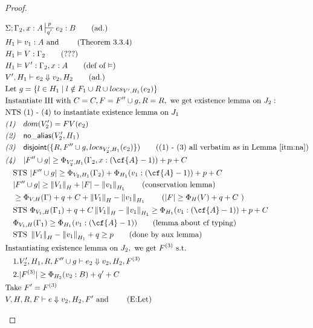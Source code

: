 \documentclass[11pt]{article}
\newcommand{\na}[1]{\mathsf{no\_alias}(#1)}
\newcommand{\dist}[1]{\mathsf{disjoint}(#1)}
\newcommand{\ssize}[2]{\left\Vert #2 \right\Vert_{#1}}
\theoremstyle{definition}
\begin{document}
\begin{proof}
\begin{description}
\begin{align*}
  &\Sigma; \Gamma_2, x : A \sststile{q'}{p} e_2 : B \tag{ad.}\\
  &H_1 \vDash v_1 : A \text{ and } \tag{Theorem 3.3.4}\\ 
  &H_1 \vDash V : \Gamma_2 \tag{???}\\
  &H_1 \vDash V' : \Gamma_2, x : A \tag{def of $\vDash$}\\
  &V',H_1 \vdash e_2 \Downarrow v_2,H_2 \tag{ad.}\\
  &\text{Let } g = \{l \in H_1 \mid l \notin F_1 \cup R \cup locs_{V',H_1}(e_2)\}\\ 
  &\text{Instantiate IH with } C = C, F = F'' \cup g, R = R, \text{ we get existence lemma on  } J_2:\\
  &\text{NTS (1) - (4) to instantiate existence lemma on } J_1\\
  &\emph{(1)} \quad dom(V_2') = FV(e_2)\\
  &\emph{(2)} \quad \na{V_2',H_1} \\
  &\emph{(3)} \quad \dist{\{R,F'' \cup g,locs_{V_2',H_1}(e_2)\}} \tag{(1) - (3) all verbatim as in Lemma $\ref{itm:na}$}\\
  &\emph{(4)} \quad |F'' \cup g| \ge \Phi_{V_2',H_1}(\Gamma_2,x: (\cf{A} - 1)) + p + C\\
  &\quad \text{STS } |F'' \cup g| \ge \Phi_{V_2,H_1}(\Gamma_2) + \Phi_{H_1}(v_1 : (\cf{A} - 1)) + p + C\\
  &\quad |F'' \cup g| \ge \ssize{H}{V_1} + |F| - \ssize{H_1}{v_1} \tag{conservation lemma}\\
  &\quad \ge \Phi_{V,H}(\Gamma) + q + C + \ssize{H}{V_1} - \ssize{H_1}{v_1} 
    \tag{$|F| \ge \Phi_{H}(V) + q + C$ }\\
  &\quad \text{STS } \Phi_{V_1,H}(\Gamma_1) + q + C \ssize{H}{V_1} - \ssize{H_1}{v_1} \ge \Phi_{H_1}(v_1 : (\cf{A} - 1)) + p + C\\
  &\quad \Phi_{V_1,H}(\Gamma_1) \ge \Phi_{H_1}(v_1 : (\cf{A} - 1)) \tag{lemma about cf typing}\\
  &\quad \text{STS } \ssize{H}{V_1} - \ssize{H_1}{v_1} + q \ge p \tag{done by aux lemma}\\
  &\text{Instantiating existence lemma on } J_2, \text{ we get } F^{(3)} \text{ s.t. }\\
  &\quad 1. V_2',H_1,R, F'' \cup g \vdash e_2 \Downarrow v_2,H_2,F^{(3)} \\
  &\quad 2. |F^{(3)}| \ge \Phi_{H_2}(v_2:B) + q' + C\\
  &\text{Take } F' = F^{(3)}\\
  &V,H,R,F \vdash e \Downarrow v_2, H_2,F' \text{ and } \tag{E:Let}\\ 

\end{align*}
\end{description}
\end{proof}
\end{document}
